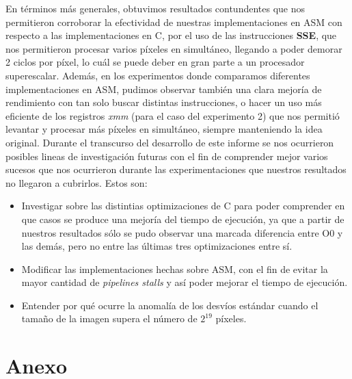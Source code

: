 \documentclass[a4paper]{article}
\begin{document}
\justify
En términos más generales, obtuvimos resultados contundentes que nos permitieron corroborar la efectividad de nuestras implementaciones en ASM con respecto a las implementaciones en C, por el uso de las instrucciones \textbf{SSE}, que nos permitieron procesar varios píxeles en simultáneo, llegando a poder demorar 2 ciclos por píxel, lo cuál se puede deber en gran parte a un procesador superescalar. Además, en los experimentos donde comparamos diferentes implementaciones en ASM, pudimos observar también una clara mejoría de rendimiento con tan solo buscar distintas instrucciones, o hacer un uso más eficiente de los registros \textit{xmm} (para el caso del experimento 2) que nos permitió levantar y procesar más píxeles en simultáneo, siempre manteniendo la idea original. 
\justify
Durante el transcurso del desarrollo de este informe se nos ocurrieron posibles lineas de investigación futuras con el fin de comprender mejor varios sucesos que nos ocurrieron durante las experimentaciones que nuestros resultados no llegaron a cubrirlos. Estos son:
\begin{itemize}
	\item  Investigar sobre las distintias optimizaciones de C para poder comprender en que casos se produce una mejoría del tiempo de ejecución, ya que a partir de nuestros resultados sólo se pudo observar una marcada diferencia entre O0 y las demás, pero no entre las últimas tres optimizaciones entre sí.
	\item Modificar las implementaciones hechas sobre ASM, con el fin de evitar la mayor cantidad de \textit{pipelines stalls} y así poder mejorar el tiempo de ejecución.
	\item Entender por qué ocurre la anomalía de los desvíos estándar cuando el tamaño de la imagen supera el número de $2^{19}$ píxeles.  
\end{itemize}  
\section{Anexo}
\end{document}
